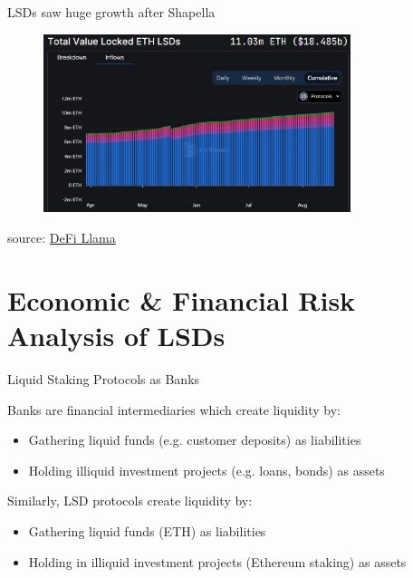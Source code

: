 \documentclass{beamer}
\begin{document}
\begin{frame}{LSDs saw huge growth after Shapella}
    \begin{figure}
        \centering
        \includegraphics[width=0.8\textwidth]{figures/lsd_2023.png}
    \end{figure}
    \tiny{source: \href{https://defillama.com/lsd}{DeFi Llama}}
    
\end{frame}

\section[Economic Analysis]{Economic \& Financial Risk Analysis of LSDs}
\begin{frame}{Liquid Staking Protocols as Banks}

    \footnotemark Banks are financial intermediaries which create liquidity by:

    \begin{itemize}
        \item Gathering liquid funds (e.g. customer deposits) as liabilities
        \item Holding illiquid investment projects (e.g. loans, bonds) as assets
    \end{itemize}
    \bigskip
    Similarly, LSD protocols create liquidity by:
    \begin{itemize}
        \item Gathering liquid funds (ETH) as liabilities
        \item Holding in illiquid investment projects (Ethereum staking) as assets
    \end{itemize}


\end{frame}
\end{document}
